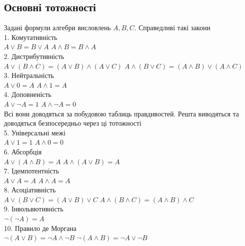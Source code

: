 \documentclass[a4paper, 14pt]{extarticle}
\theoremstyle{theoremdd}
\theoremstyle{theoremdd}
\theoremstyle{theoremdd}
\theoremstyle{theoremdd}
\theoremstyle{theoremdd}
\theoremstyle{theoremdd}
\theoremstyle{theoremdd}
\theoremstyle{theoremdd}
\begin{document}
\subsection{Основні тотожності}
Задані формули алгебри висловлень $A,B,C$. Справедливі такі закони\\
1. Комутативність\\
$A \vee B = B \vee A$ \hspace{5cm} $A \wedge B = B \wedge A$\\
2. Дистрибутивність\\
$A \vee (B \wedge C) = (A \vee B) \wedge (A \vee C)$ \hspace{1cm} $A \wedge (B \vee C) = (A \wedge B) \vee (A \wedge C)$\\
3. Нейтральність\\
$A \vee 0 = A$ \hspace{6cm} $A \wedge 1 = A$\\
4. Доповненість\\
$A \vee \neg A = 1$ \hspace{5.6cm} $A \wedge \neg A = 0$\\
Всі вони доводяться за побудовою таблиць правдивостей. Решта виводяться та доводяться безпосередньо через ці тотожності
\bigskip \\
5. Універсальні межі\\
$A \vee 1 = 1$ \hspace{6cm} $A \wedge 0 = 0$\\
6. Абсорбція\\
$A \vee (A \wedge B) = A$ \hspace{4.4cm} $A \wedge (A \vee B) = A$\\
7. Ідемпотентність\\
$A \vee A = A$ \hspace{5.7cm} $A \wedge A = A$\\
8. Асоціативність\\
$A \vee (B \vee C) = (A \vee B) \vee C$ \hspace{2cm} $A \wedge (B \wedge C) = (A \wedge B) \wedge C$\\
9. Інвольвютивність\\
$\neg (\neg A) = A$\\
10. Правило де Моргана\\
$\neg(A \vee B) = \neg A \wedge \neg B$ \hspace{3cm} $\neg(A \wedge B) = \neg A \vee \neg B$
\bigskip
\\
\end{document}
